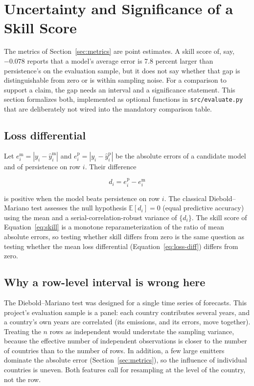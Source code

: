 \section{Uncertainty and Significance of a Skill Score}
\label{sec:uncertainty}

The metrics of Section~\ref{sec:metrics} are point estimates. A skill
score of, say, $-0.078$ reports that a model's average error is 7.8 percent
larger than persistence's on the evaluation sample, but it does not say
whether that gap is distinguishable from zero or is within sampling noise.
For a comparison to support a claim, the gap needs an interval and a
significance statement. This section formalizes both, implemented as
optional functions in \texttt{src/evaluate.py} that are deliberately not
wired into the mandatory comparison table.

\subsection{Loss differential}

Let $e_i^{\mathrm{m}} = |y_i - \hat y_i^{\mathrm{m}}|$ and
$e_i^{\mathrm{p}} = |y_i - \hat y_i^{\mathrm{p}}|$ be the absolute errors of
a candidate model and of persistence on row $i$. Their difference

\begin{equation}
\label{eq:loss-diff}
d_i = e_i^{\mathrm{p}} - e_i^{\mathrm{m}}
\end{equation}

is positive when the model beats persistence on row $i$. The classical
Diebold--Mariano test \cite{diebold1995comparing} assesses the null
hypothesis $\mathbb{E}[d_i]=0$ (equal predictive accuracy) using the mean
and a serial-correlation-robust variance of $\{d_i\}$. The skill score of
Equation~\ref{eq:skill} is a monotone reparameterization of the ratio of
mean absolute errors, so testing whether skill differs from zero is the
same question as testing whether the mean loss differential
(Equation~\ref{eq:loss-diff}) differs from zero.

\subsection{Why a row-level interval is wrong here}

The Diebold--Mariano test was designed for a single time series of
forecasts. This project's evaluation sample is a panel: each country
contributes several years, and a country's own years are correlated
(its emissions, and its errors, move together). Treating the $n$ rows as
independent would understate the sampling variance, because the effective
number of independent observations is closer to the number of countries
than to the number of rows. In addition, a few large emitters dominate the
absolute error (Section~\ref{sec:metrics}), so the influence of individual
countries is uneven. Both features call for resampling at the level of the
country, not the row.

